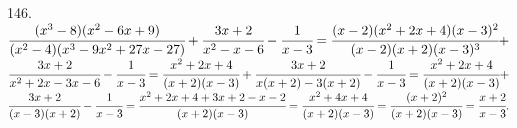 146. $\cfrac{(x^3-8)(x^2-6x+9)}{(x^2-4)(x^3-9x^2+27x-27)}+\cfrac{3x+2}{x^2-x-6}-\cfrac{1}{x-3}=
\cfrac{(x-2)(x^2+2x+4)(x-3)^2}{(x-2)(x+2)(x-3)^3}+$\\$\cfrac{3x+2}{x^2+2x-3x-6}-\cfrac{1}{x-3}=
\cfrac{x^2+2x+4}{(x+2)(x-3)}+\cfrac{3x+2}{x(x+2)-3(x+2)}-\cfrac{1}{x-3}=
\cfrac{x^2+2x+4}{(x+2)(x-3)}+$\\$\cfrac{3x+2}{(x-3)(x+2)}-\cfrac{1}{x-3}=
\cfrac{x^2+2x+4+3x+2-x-2}{(x+2)(x-3)}=\cfrac{x^2+4x+4}{(x+2)(x-3)}=\cfrac{(x+2)^2}{(x+2)(x-3)}=\cfrac{x+2}{x-3}.$\\
